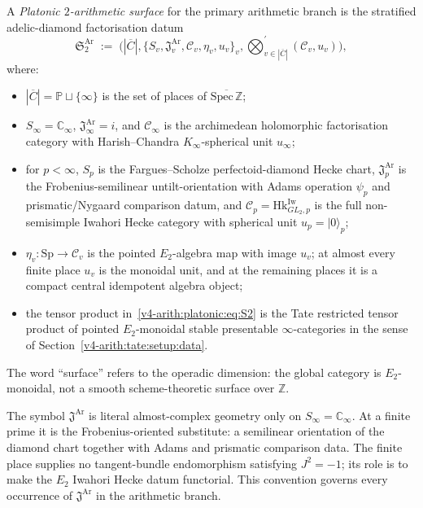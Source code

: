 \begin{definition}
\label{v4-arith:platonic:def:S2}
A \emph{Platonic \(2\)-arithmetic surface}
for the primary arithmetic branch is the stratified adelic-diamond
factorisation datum
\begin{equation}
\label{v4-arith:platonic:eq:S2}
\mathfrak{S}^{\mathrm{Ar}}_{2}
\;:=\;
\bigl(|\overline{C}|,\{S_{v},\mathfrak{J}^{\mathrm{Ar}}_{v},\mathcal{C}_{v},\eta_{v},u_{v}\}_{v},
\bigotimes_{v\in|\overline{C}|}^{\prime}(\mathcal{C}_{v},u_{v})\bigr),
\end{equation}
where:
\begin{itemize}
\item \(|\overline{C}|=\mathbb{P}\sqcup\{\infty\}\) is the set of
places of \(\overline{\mathrm{Spec}\,\mathbb{Z}}\);
\item \(S_{\infty}=\mathbb{C}_{\infty}\),
\(\mathfrak{J}^{\mathrm{Ar}}_{\infty}=i\), and
\(\mathcal{C}_{\infty}\) is the archimedean holomorphic
factorisation category with Harish--Chandra
\(K_{\infty}\)-spherical unit \(u_{\infty}\);
\item for \(p<\infty\), \(S_{p}\) is the Fargues--Scholze
perfectoid-diamond Hecke chart, \(\mathfrak{J}^{\mathrm{Ar}}_{p}\)
is the Frobenius-semilinear untilt-orientation with Adams
operation \(\psi_{p}\) and prismatic/Nygaard comparison datum, and
\(\mathcal{C}_{p}=\mathrm{Hk}^{\mathrm{Iw}}_{GL_{2},p}\) is the full
non-semisimple Iwahori Hecke category with spherical unit
\(u_{p}=|0\rangle_{p}\);
\item \(\eta_{v}\colon\mathrm{Sp}\to\mathcal{C}_{v}\) is the pointed
\(E_{2}\)-algebra map with image \(u_{v}\); at almost every finite place
\(u_{v}\) is the monoidal unit, and at the remaining places it is a
compact central idempotent algebra object;
\item the tensor product in~\eqref{v4-arith:platonic:eq:S2} is the
Tate restricted tensor product of pointed \(E_{2}\)-monoidal stable
presentable \(\infty\)-categories in the sense of
Section~\ref{v4-arith:tate:setup:data}.
\end{itemize}
The word ``surface'' refers to the operadic dimension: the global
category is \(E_{2}\)-monoidal, not a smooth scheme-theoretic surface
over \(\mathbb{Z}\).
\end{definition}

\begin{remark}
\label{v4-arith:platonic:rem:almost-complex}
The symbol \(\mathfrak{J}^{\mathrm{Ar}}\) is literal almost-complex
geometry only on \(S_{\infty}=\mathbb{C}_{\infty}\). At a finite prime
it is the Frobenius-oriented substitute: a semilinear orientation of
the diamond chart together with Adams and prismatic comparison data.
The finite place supplies no tangent-bundle endomorphism satisfying
\(J^{2}=-1\); its role is to make the \(E_{2}\) Iwahori Hecke datum
functorial.
This convention governs every occurrence of
\(\mathfrak{J}^{\mathrm{Ar}}\) in the arithmetic branch.
\end{remark}

